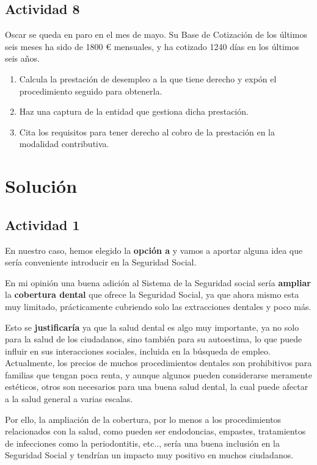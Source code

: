 \subsection{Actividad 8}
Oscar se queda en paro en el mes de mayo. Su Base de Cotización de los últimos seis meses ha sido de 1800 € mensuales, y ha cotizado 1240 días en los últimos seis años.

\begin{enumerate}
    \item Calcula la prestación de desempleo a la que tiene derecho y expón el procedimiento seguido para obtenerla.
    \item Haz una captura de la entidad que gestiona dicha prestación.
    \item Cita los requisitos para tener derecho al cobro de la prestación en la modalidad contributiva.
\end{enumerate}

\section{Solución}

\subsection{Actividad 1}
En nuestro caso, hemos elegido la \textbf{opción a} y vamos a aportar alguna idea que sería conveniente introducir en la Seguridad Social.

En mi opinión una buena adición al Sistema de la Seguridad social sería \textbf{ampliar} la \textbf{cobertura dental} que ofrece la Seguridad Social, ya que ahora mismo esta muy limitado, prácticamente cubriendo solo las extracciones dentales y poco más.

Esto se \textbf{justificaría} ya que la salud dental es algo muy importante, ya no solo para la salud de los ciudadanos, sino también para su autoestima, lo que puede influir en sus interacciones sociales, incluida en la búsqueda de empleo. Actualmente, los precios de muchos procedimientos dentales son prohibitivos para familias que tengan poca renta, y aunque algunos pueden considerarse meramente estéticos, otros son necesarios para una buena salud dental, la cual puede afectar a la salud general a varias escalas.

Por ello, la ampliación de la cobertura, por lo menos a los procedimientos relacionados con la salud, como pueden ser endodoncias, empastes, tratamientos de infecciones como la periodontitis, etc.., sería una buena inclusión en la Seguridad Social y tendrían un  impacto muy positivo en muchos ciudadanos.

